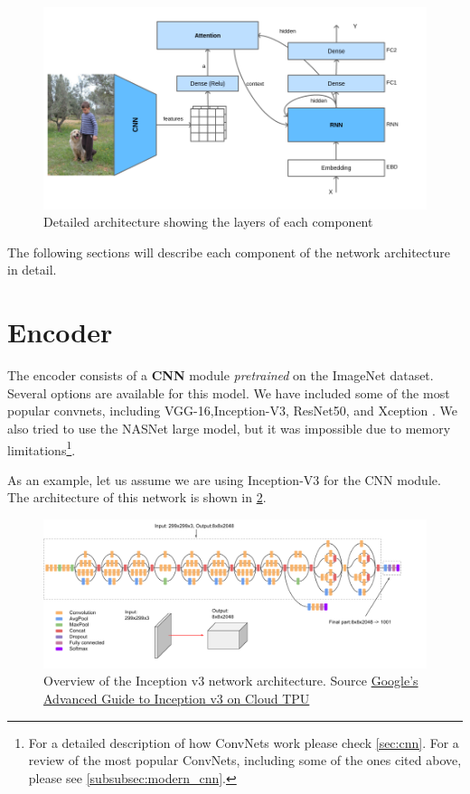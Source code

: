 \begin{figure}[hpt]
	\centering
	\includegraphics[scale=0.5]{images/ch4/overall-architecture.png}
	\caption{Detailed architecture showing the layers of each component}
	\label{fig:overall-architecture}
\end{figure}


The following sections will describe each component of the network architecture in detail.

\section{Encoder}\label{sec:encoder}

The encoder consists of a \textbf{CNN} module \textit{pretrained} on the ImageNet dataset. Several options are available for this model. We have included some of the most popular convnets, including VGG-16\citep{Simonyan2015},Inception-V3\citep{Szegedy2016}, ResNet50\citep{He2016resnet}, and Xception \citep{Chollet2017}. We also tried to use the NASNet \citep{Zoph2018} large model, but it was impossible due to memory limitations\footnote{For a detailed description of how ConvNets work please check \cref{sec:cnn}. For a review of the most popular ConvNets, including some of the ones cited above, please see \cref{subsubsec:modern_cnn}.}.

As an example, let us assume we are using Inception-V3 for the CNN module. The architecture of this network is shown in \cref{fig:inceptionv3}.

\begin{figure}[hpt]
	\centering
	\includegraphics[scale=0.5]{images/ch4/inceptionv3.png}
	\caption{Overview of the Inception v3 network architecture. Source \href{https://cloud.google.com/tpu/docs/inception-v3-advanced}{Google's Advanced Guide to Inception v3 on Cloud TPU}}
	\label{fig:inceptionv3}
\end{figure}

